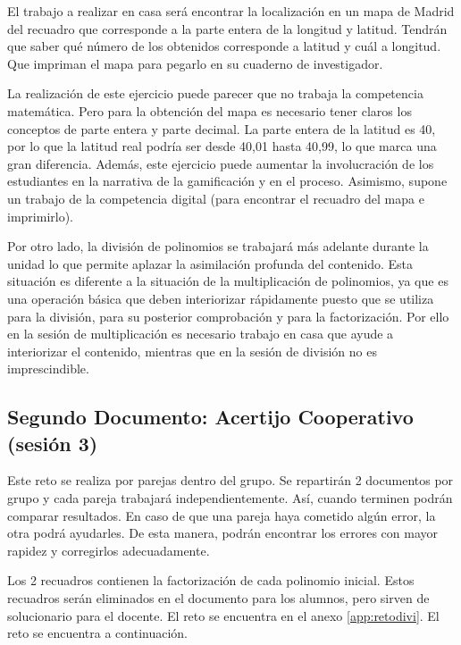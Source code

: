 El trabajo a realizar en casa será encontrar la localización en un mapa de Madrid del recuadro que corresponde a la parte entera de la longitud y latitud.
%
Tendrán que saber qué número de los obtenidos corresponde a latitud y cuál a longitud.
%
Que impriman el mapa para pegarlo en su cuaderno de investigador.

\Justificacion{}
%
La realización de este ejercicio puede parecer que no trabaja la competencia matemática. 
%
Pero para la obtención del mapa es necesario tener claros los conceptos de parte entera y parte decimal.
%
La parte entera de la latitud es 40, por lo que la latitud real podría ser desde 40,01 hasta 40,99, lo que marca una gran diferencia.
%
Además, este ejercicio puede aumentar la involucración de los estudiantes en la narrativa de la gamificación y en el proceso.
%
Asimismo, supone un trabajo de la competencia digital (para encontrar el recuadro del mapa e imprimirlo).

Por otro lado, la división de polinomios se trabajará más adelante durante la unidad lo que permite aplazar la asimilación profunda del contenido.
%
Esta situación es diferente a la situación de la multiplicación de polinomios, ya que es una operación básica que deben interiorizar rápidamente puesto que se utiliza para la división, para su posterior comprobación y para la factorización.
%
Por ello en la sesión de multiplicación es necesario trabajo en casa que ayude a interiorizar el contenido, mientras que en la sesión de división no es imprescindible.


\subsection{Segundo Documento: Acertijo Cooperativo (sesión 3)}
\label{app:ses3:coop}

Este reto se realiza por parejas dentro del grupo.
%
Se repartirán 2 documentos por grupo y cada pareja trabajará independientemente. 
%
Así, cuando terminen podrán comparar resultados. 
%
En caso de que una pareja haya cometido algún error, la otra podrá ayudarles. 
%
De esta manera, podrán encontrar los errores con mayor rapidez y corregirlos adecuadamente.

Los 2 recuadros contienen la factorización de cada polinomio inicial.
%
Estos recuadros serán eliminados en el documento para los alumnos, pero sirven de solucionario para el docente.
%
\ifinapp
	El reto se encuentra en el anexo \ref{app:retodivi}.
\else 
	El reto se encuentra a continuación.
	
\fi


